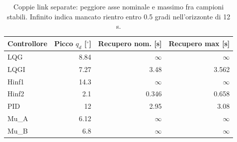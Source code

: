 \begin{table}[htbp]\centering\small
\setlength{\tabcolsep}{4pt}
\begin{tabular}{lrrr}\toprule
Controllore & Picco $q_d$ [$^\circ$] & Recupero nom. [s] & Recupero max [s]\\\midrule
LQG & \num{8.84} & $\infty$ & $\infty$\\
LQGI & \num{7.27} & \num{3.48} & \num{3.562}\\
Hinf1 & \num{14.3} & $\infty$ & $\infty$\\
Hinf2 & \num{2.1} & \num{0.346} & \num{0.658}\\
PID & \num{12} & \num{2.95} & \num{3.08}\\
Mu\_A & \num{6.12} & $\infty$ & $\infty$\\
Mu\_B & \num{6.8} & $\infty$ & $\infty$\\
\bottomrule\end{tabular}
\caption{Coppie link separate: peggiore asse nominale e massimo fra campioni stabili. Infinito indica mancato rientro entro 0.5 gradi nell'orizzonte di 12 s.}
\end{table}
